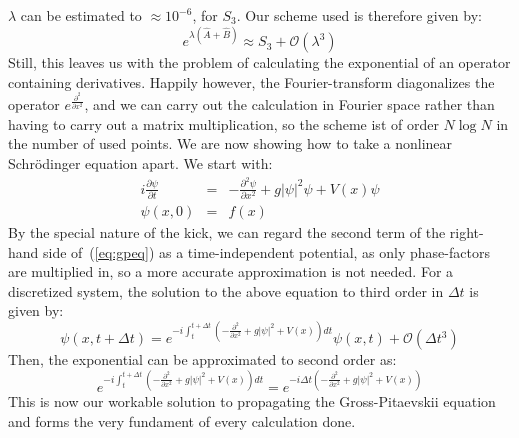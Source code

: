 $\lambda$ can be estimated to $\approx 10^{-6}$, for $S_3$.  
Our scheme used is therefore given by:
\begin{equation}\label{eq:ourcscheme}
	e^{\lambda(\hat{A}+\hat{B})}\approx S_3+\mathcal{O}(\lambda^3)
\end{equation}
Still, this leaves us with the problem of calculating the exponential of an operator containing derivatives. Happily however, the Fourier-transform diagonalizes 
the operator $e^{\frac{\partial^2}{\partial x^2}}$, and we can carry out the calculation in Fourier space rather than having to carry out a matrix multiplication, 
so the scheme ist of order $N\log N$ in the number of used points. We are now showing how to take a nonlinear Schr\"odinger equation apart.
We start with:
\begin{eqnarray}
	i\frac{\partial \psi}{\partial t}&=&-\frac{\partial^2\psi}{\partial x^2}+g|\psi|^2\psi+V(x)\psi\label{eq:gpeq}\\
	\psi(x, 0)&=&f(x)
\end{eqnarray}
By the special nature of the kick, we can regard the second term of the right-hand side of~(\ref{eq:gpeq}) as a time-independent potential, as only phase-factors are multiplied in, so a more accurate approximation is not needed.
For a discretized system, the solution to the above equation to third order in $\Delta t$ is given by:
\begin{equation}\label{eq:thirdordersol}
	\psi(x, t+\Delta t)=e^{-i\int_t^{t+\Delta t}\left(-\frac{\partial^2}{\partial x^2}+g|\psi|^2+V(x)\right)dt}\psi(x, t)+\mathcal{O}(\Delta t^3)
\end{equation}
Then, the exponential can be approximated to second order as:
\begin{equation}\label{eq:exapprox}
	e^{-i\int_t^{t+\Delta t}\left(-\frac{\partial^2}{\partial x^2}+g|\psi|^2+V(x)\right)dt}=e^{-i\Delta t \left(-\frac{\partial^2}{\partial x^2}+g|\psi|^2+V(x)\right)}
\end{equation}
This is now our workable solution to propagating the Gross-Pitaevskii equation and forms the very fundament of every calculation done.

